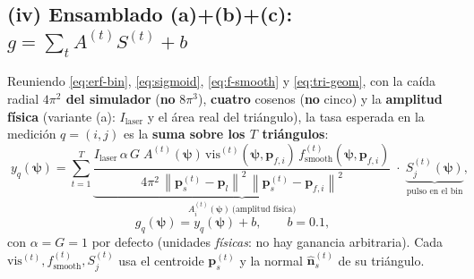 \documentclass[11pt,a4paper]{article}
\theoremstyle{plain}
\theoremstyle{definition}
\newcommand{\vect}[1]{\boldsymbol{#1}}
\newcommand{\norm}[1]{\left\lVert #1 \right\rVert}
\begin{document}
\subsection{(iv) Ensamblado (a)+(b)+(c): \texorpdfstring{$g=\sum_t A^{(t)} S^{(t)}+b$}{g = sum A S + b}}
\label{sec:ensamble}

Reuniendo \eqref{eq:erf-bin}, \eqref{eq:sigmoid}, \eqref{eq:f-smooth} y
\eqref{eq:tri-geom}, con la ca\'ida radial \textbf{$4\pi^2$ del simulador}
(\textbf{no} $8\pi^3$), \textbf{cuatro} cosenos (\textbf{no} cinco) y la
\textbf{amplitud f\'isica} (variante (a): $I_{\mathrm{laser}}$ y el \'area real del
tri\'angulo), la tasa esperada en la medici\'on $q=(i,j)$ es la \textbf{suma sobre
los $T$ tri\'angulos}:
\begin{equation}
    \boxed{\;
    y_q(\vect{\psi})
    =\sum_{t=1}^{T}
    \underbrace{\frac{I_{\mathrm{laser}}\,\alpha\,G\;A^{(t)}(\vect\psi)\,
                      \mathrm{vis}^{(t)}(\vect{\psi},\vect{p}_{f,i})\,
                      f_{\mathrm{smooth}}^{(t)}(\vect{\psi},\vect{p}_{f,i})}
                     {4\pi^2\,\norm{\vect{p}_s^{(t)}-\vect{p}_l}^2\,
                      \norm{\vect{p}_s^{(t)}-\vect{p}_{f,i}}^2}}
                     _{\textstyle A_i^{(t)}(\vect{\psi})\ \text{(amplitud f\'isica)}}
    \;\cdot\;
    \underbrace{S_j^{(t)}(\vect{\psi})}_{\textstyle \text{pulso en el bin}} ,
    \;}
    \label{eq:yq-smooth}
\end{equation}
\begin{equation}
    g_q(\vect{\psi}) = y_q(\vect{\psi}) + b,\qquad b=0.1 ,
    \label{eq:g-smooth}
\end{equation}
con $\alpha=G=1$ por defecto (unidades \emph{f\'isicas}: no hay ganancia
arbitraria). Cada $\mathrm{vis}^{(t)},f_{\mathrm{smooth}}^{(t)},S_j^{(t)}$ usa el
centroide $\vect p_s^{(t)}$ y la normal $\hat{\vect n}_s^{(t)}$ de su tri\'angulo.
\end{document}
